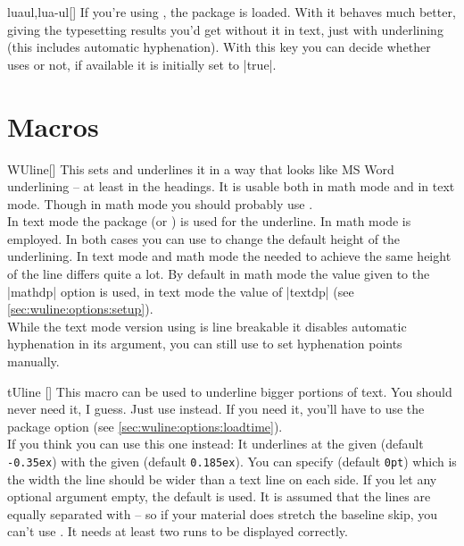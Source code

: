 \begin{describeopt}{luaul,lua-ul}[]
  If you're using , the  package is loaded. With it
   behaves much better, giving the typesetting results you'd get
  without it in text, just with underlining (this includes automatic
  hyphenation). With this key you can decide whether  uses
   or not, if available it is initially set to |true|.
\end{describeopt}

\section{Macros}\label{sec:wuline:mac}%
\begin{describemacro}{WUline}[]%
  This sets  and underlines it in a way that looks like MS Word
  underlining -- at least in the headings. It is usable both in math mode and in
  text mode. Though in math mode you should probably use
  .\\[\parskip]
  In text mode the  package (or ) is used for the
  underline. In math mode  is employed. In both cases you can
  use  to change the default height of the underlining. In text
  mode and math mode the needed  to achieve the same height of the
  line differs quite a lot. By default in math mode the value given to the
  |mathdp| option is used, in text mode the value of |textdp| (see
  \autoref{sec:wuline:options:setup}).\\[\parskip]
  While the text mode version using  is line breakable it disables
  automatic hyphenation in its argument, you can still use \cs{-} to set
  hyphenation points manually.
\end{describemacro}%
\begin{describemacro}{tUline}%
  []
  This macro can be used to underline bigger portions of text. You should never
  need it, I guess. Just use  instead. If you need it, you'll have to
  use the package option  (see
  \autoref{sec:wuline:options:loadtime}).\\[\parskip]
  If you think you can use this one instead: It underlines  at the
  given  (default \texttt{-0.35ex}) with the given 
  (default \texttt{0.185ex}). You can specify  (default
  \texttt{0pt}) which is the width the line should be wider than a text line on
  each side. If you let any optional argument empty, the default is used. It is
  assumed that the lines are equally separated with  -- so if
  your material does stretch the baseline skip, you can't use . It
  needs at least two runs to be displayed correctly.
\end{describemacro}%

